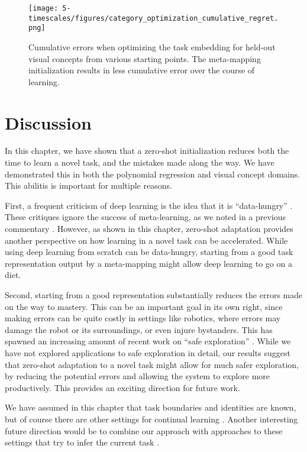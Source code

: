 \begin{figure}
\centering
\texttt{[image: 5-timescales/figures/category\_optimization\_cumulative\_regret.png]}
\caption[Cumulative errors when optimizing the task embedding for held-out visual concepts from various starting points.]{Cumulative errors when optimizing the task embedding for held-out visual concepts from various starting points. The meta-mapping initialization results in less cumulative error over the course of learning.} \label{fig:timescales_category_optimization_regret}
\end{figure}

\section{Discussion}
In this chapter, we have shown that a zero-shot initialization reduces both the time to learn a novel task, and the mistakes made along the way. We have demonstrated this in both the polynomial regression and visual concept domains. This abilitis is important for multiple reasons. \par 
First, a frequent criticism of deep learning is the idea that it is ``data-hungry'' \citep[e.g.]{Lake2016, Marcus2018}. These critiques ignore the success of meta-learning, as we noted in a previous commentary \citep{Hansen2017}. However, as shown in this chapter, zero-shot adaptation provides another perspective on how learning in a novel task can be accelerated. While using deep learning from scratch can be data-hungry, starting from a good task representation output by a meta-mapping might allow deep learning to go on a diet. \par  
Second, starting from a good representation substantially reduces the errors made on the way to mastery. This can be an important goal in its own right, since making errors can be quite costly in settings like robotics, where errors may damage the robot or its surroundings, or even injure bystanders. This has spawned an increasing amount of recent work on ``safe exploration'' \citep[e.g.][]{Turchetta2016, Turchetta2019}. While we have not explored applications to safe exploration in detail, our results suggest that zero-shot adaptation to a novel task might allow for much safer exploration, by reducing the potential errors and allowing the system to explore more productively. This provides an exciting direction for future work. \par  
We have assumed in this chapter that task boundaries and identities are known, but of course there are other settings for continual learning \citep{Ven2018}. Another interesting future direction would be to combine our approach with approaches to these settings that try to infer the current task \citep[e.g][]{Nagabandi2019}. \par
